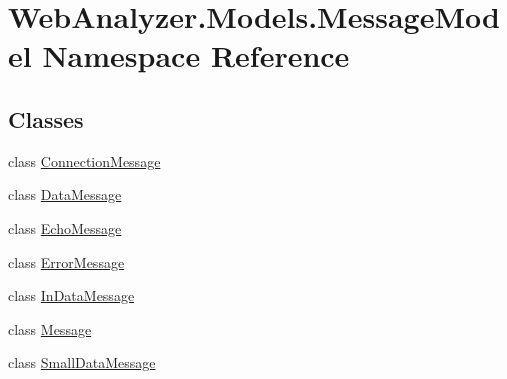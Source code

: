 \hypertarget{namespace_web_analyzer_1_1_models_1_1_message_model}{}\section{Web\+Analyzer.\+Models.\+Message\+Model Namespace Reference}
\label{namespace_web_analyzer_1_1_models_1_1_message_model}
\subsection*{Classes}
\begin{DoxyCompactItemize}
\item 
class \hyperlink{class_web_analyzer_1_1_models_1_1_message_model_1_1_connection_message}{Connection\+Message}
\item 
class \hyperlink{class_web_analyzer_1_1_models_1_1_message_model_1_1_data_message}{Data\+Message}
\item 
class \hyperlink{class_web_analyzer_1_1_models_1_1_message_model_1_1_echo_message}{Echo\+Message}
\item 
class \hyperlink{class_web_analyzer_1_1_models_1_1_message_model_1_1_error_message}{Error\+Message}
\item 
class \hyperlink{class_web_analyzer_1_1_models_1_1_message_model_1_1_in_data_message}{In\+Data\+Message}
\item 
class \hyperlink{class_web_analyzer_1_1_models_1_1_message_model_1_1_message}{Message}
\item 
class \hyperlink{class_web_analyzer_1_1_models_1_1_message_model_1_1_small_data_message}{Small\+Data\+Message}
\end{DoxyCompactItemize}

